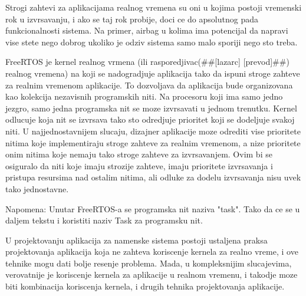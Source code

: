 \documentclass[a4paper,12pt, master]{etf}
\begin{document}
	Strogi zahtevi za aplikacijama realnog vremena su oni u kojima postoji vremenski rok u
	izvrsavanju, i ako se taj rok probije, doci ce do apsolutnog pada funkcionalnosti sistema. Na
	primer, airbag u kolima ima potencijal da napravi vise stete nego dobrog ukoliko je odziv
	sistema samo malo sporiji nego sto treba.

	FreeRTOS je kernel realnog vrmena (ili rasporedjivac(\#\#[lazarc] [prevod]\#\#) realnog vremena) na
	koji se nadogradjuje aplikacija tako da ispuni stroge zahteve za realnim vremenom aplikacije.
	To dozvoljava da aplikacija bude organizovana kao kolekcija nezavisnih programskih niti. Na
	procesoru koji ima samo jedno jezgro, samo jedna programska nit se moze izvrsavati u jednom
	trenutku. Kernel odlucuje koja nit se izvrsava tako sto odredjuje prioritet koji se dodeljuje
	svakoj niti. U najjednostavnijem slucaju, dizajner aplikacije moze odrediti vise prioritete
	nitima koje implementiraju stroge zahteve za realnim vremenom, a nize prioritete onim nitima
	koje nemaju tako stroge zahteve za izvrsavanjem. Ovim bi se osiguralo da niti koje imaju
	strozije zahteve, imaju prioritete izvrsavanja i pristupa resursima nad ostalim nitima, ali
	odluke za dodelu izvrsavanja nisu uvek tako jednostavne.

	Napomena: Unutar FreeRTOS-a se programska nit naziva "task". Tako da ce se u daljem tekstu i
	koristiti naziv Task za programsku nit.

	U projektovanju aplikacija za namenske sistema postoji ustaljena praksa projektovanja
	aplikacija koja ne zahteva koriscenje kernela za realno vreme, i ove tehnike mogu dati bolje
	resenje problema. Mada, u kompleksnijim slucajevima, verovatnije je koriscenje kernela za
	aplikacije u realnom vremenu, i takodje moze biti kombinacija koriscenja kernela, i drugih
	tehnika projektovanja aplikacije.
\end{document}

